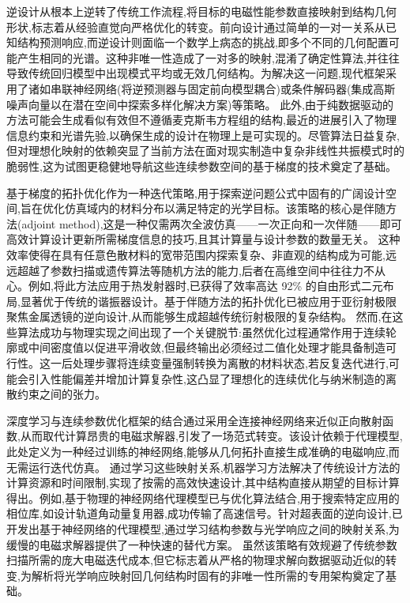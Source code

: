 \documentclass[11pt]{article}
\begin{document}
逆设计从根本上逆转了传统工作流程,将目标的电磁性能参数直接映射到结构几何形状,标志着从经验直觉向严格优化的转变。前向设计通过简单的一对一关系从已知结构预测响应,而逆设计则面临一个数学上病态的挑战,即多个不同的几何配置可能产生相同的光谱。这种非唯一性造成了一对多的映射,混淆了确定性算法,并往往导致传统回归模型中出现模式平均或无效几何结构。为解决这一问题,现代框架采用了诸如串联神经网络(将逆预测器与固定前向模型耦合)或条件解码器(集成高斯噪声向量以在潜在空间中探索多样化解决方案)等策略。\citep{doi_10_1364_josab_497661_d333080a} \citep{doi_10_1038_s41467_025_57516_z_7c69e056} 此外,由于纯数据驱动的方法可能会生成看似有效但不遵循麦克斯韦方程组的结构,最近的进展引入了物理信息约束和光谱先验,以确保生成的设计在物理上是可实现的。尽管算法日益复杂,但对理想化映射的依赖突显了当前方法在面对现实制造中复杂非线性共振模式时的脆弱性,这为试图更稳健地导航这些连续参数空间的基于梯度的技术奠定了基础。\citep{doi_10_1088_1361_6463_ad3e05_d24e0a0a} \citep{doi_10_23919_piers_fall62445_2025_11394631_4fdb8517} \citep{doi_10_71465_fapm546_bda368a5}

基于梯度的拓扑优化作为一种迭代策略,用于探索逆问题公式中固有的广阔设计空间,旨在优化仿真域内的材料分布以满足特定的光学目标。该策略的核心是伴随方法(adjoint method),这是一种仅需两次全波仿真------一次正向和一次伴随------即可高效计算设计更新所需梯度信息的技巧,且其计算量与设计参数的数量无关。\citep{doi_10_1088_1367_2630_acfcd6_32444f17} 这种效率使得在具有任意色散材料的宽带范围内探索复杂、非直观的结构成为可能,远远超越了参数扫描或遗传算法等随机方法的能力,后者在高维空间中往往力不从心。例如,将此方法应用于热发射器时,已获得了效率高达 92\% 的自由形式二元布局,显著优于传统的谐振器设计。基于伴随方法的拓扑优化已被应用于亚衍射极限聚焦金属透镜的逆向设计,从而能够生成超越传统衍射极限的复杂结构。\citep{doi_10_1088_1367_2630_acfcd6_32444f17} 然而,在这些算法成功与物理实现之间出现了一个关键脱节:虽然优化过程通常作用于连续轮廓或中间密度值以促进平滑收敛,但最终输出必须经过二值化处理才能具备制造可行性。这一后处理步骤将连续变量强制转换为离散的材料状态,若反复迭代进行,可能会引入性能偏差并增加计算复杂性,这凸显了理想化的连续优化与纳米制造的离散约束之间的张力。\citep{doi_10_48550_arxiv_2603_15210_fdcfb92f} \citep{doi_10_1021_acsphotonics_3c00572_fda8f742} \citep{doi_10_1002_adom_202500249_9967e710}

深度学习与连续参数优化框架的结合通过采用全连接神经网络来近似正向散射函数,从而取代计算昂贵的电磁求解器,引发了一场范式转变。该设计依赖于代理模型,此处定义为一种经过训练的神经网络,能够从几何拓扑直接生成准确的电磁响应,而无需运行迭代仿真。\citep{doi_10_1109_jmmct_2025_3544270_6b4eb6dd} 通过学习这些映射关系,机器学习方法解决了传统设计方法的计算资源和时间限制,实现了按需的高效快速设计,其中结构直接从期望的目标计算得出。例如,基于物理的神经网络代理模型已与优化算法结合,用于搜索特定应用的相位库,如设计轨道角动量复用器,成功传输了高速信号。针对超表面的逆向设计,已开发出基于神经网络的代理模型,通过学习结构参数与光学响应之间的映射关系,为缓慢的电磁求解器提供了一种快速的替代方案。\citep{doi_10_1364_prj_450564_4b46735d} 虽然该策略有效规避了传统参数扫描所需的庞大电磁迭代成本,但它标志着从严格的物理求解向数据驱动近似的转变,为解析将光学响应映射回几何结构时固有的非唯一性所需的专用架构奠定了基础。\citep{doi_10_71465_fapm546_bda368a5} \citep{doi_10_1364_prj_450564_4b46735d} \citep{doi_10_1088_1361_6463_ab8036_d433363a}
\end{document}
